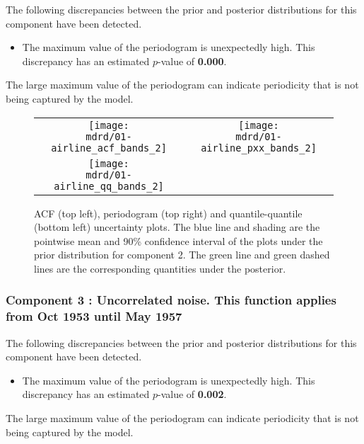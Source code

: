 \documentclass{article} %
\begin{document}
The following discrepancies between the prior and posterior distributions for this component have been detected.

\begin{itemize}

    \item The maximum value of the periodogram is unexpectedly high. This discrepancy has an estimated $p$-value of \textbf{0.000}.
\end{itemize}

The large maximum value of the periodogram can indicate periodicity that is not being captured by the model.


\begin{figure}[H]
\newcommand{\wmgd}{0.5\columnwidth}
\newcommand{\hmgd}{3.0cm}
\newcommand{\mdrd}{01-airline}
\newcommand{\mbm}{\hspace{-0.3cm}}
\begin{tabular}{cc}
\mbm \texttt{[image: \\mdrd/01-airline\_acf\_bands\_2]} & \texttt{[image: \\mdrd/01-airline\_pxx\_bands\_2]} \\
\mbm \texttt{[image: \\mdrd/01-airline\_qq\_bands\_2]}
\end{tabular}
\caption{
ACF (top left), periodogram (top right) and quantile-quantile (bottom left) uncertainty plots.
The blue line and shading are the pointwise mean and 90\% confidence interval of the plots under the prior distribution for component 2.
The green line and green dashed lines are the corresponding quantities under the posterior.}
\label{fig:check2}
\end{figure}

\subsubsection{Component 3 : Uncorrelated noise. This function applies from Oct 1953 until May 1957}


The following discrepancies between the prior and posterior distributions for this component have been detected.

\begin{itemize}

    \item The maximum value of the periodogram is unexpectedly high. This discrepancy has an estimated $p$-value of \textbf{0.002}.
\end{itemize}

The large maximum value of the periodogram can indicate periodicity that is not being captured by the model.
\end{document}
